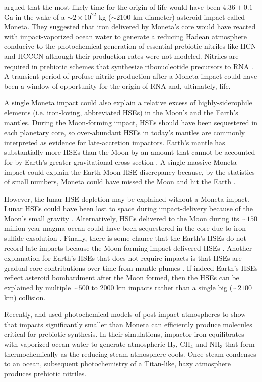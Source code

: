 \documentclass[manuscript]{aastex63}
\begin{document}
\citet{Benner_2020} argued that the most likely time for the origin of life would have been $4.36 \pm 0.1$ Ga in the wake of a $\sim 2 \times 10^{22}$ kg ($\sim 2100$ km diameter) asteroid impact called Moneta. They suggested that iron delivered by Moneta's core would have reacted with impact-vaporized ocean water to generate a reducing Hadean atmosphere conducive to the photochemical generation of essential prebiotic nitriles like HCN and HCCCN although their production rates were not modeled. Nitriles are required in prebiotic schemes that synthesize ribonucleotide precursors to RNA \citep{Patel_2015,Powner_2009,Becker_2019}. A transient period of profuse nitrile production after a Moneta impact could have been a window of opportunity for the origin of RNA and, ultimately, life.

A single Moneta impact could also explain a relative excess of highly-siderophile elements (i.e. iron-loving, abbreviated HSEs) in the Moon's and the Earth's mantles. During the Moon-forming impact, HSEs should have been sequestered in each planetary core, so over-abundant HSEs in today's mantles are commonly interpreted as evidence for late-accretion impactors. Earth's mantle has substantially more HSEs than the Moon by an amount that cannot be accounted for by Earth's greater gravitational cross section \citep{Day_2015}. A single massive Moneta impact could explain the Earth-Moon HSE discrepancy because, by the statistics of small numbers, Moneta could have missed the Moon and hit the Earth \citep{Sleep_1989,Bottke_2010}.

However, the lunar HSE depletion may be explained without a Moneta impact. Lunar HSEs could have been lost to space during impact-delivery because of the Moon's small gravity \citep{Kraus_2015}. Alternatively, HSEs delivered to the Moon during its $\sim 150$ million-year magma ocean could have been sequestered in the core due to iron sulfide exsolution \citep{Morbidelli_2018,Rubie_2016}. Finally, there is some chance that the Earth's HSEs do not record late impacts because the Moon-forming impact delivered HSEs \citep{Sleep_2016}. Another explanation for Earth's HSEs that does not require impacts is that HSEs are gradual core contributions over time from mantle plumes \citep{Halliday_2023,Mundl_2020}. If indeed Earth's HSEs reflect asteroid bombardment after the Moon formed, then the HSEs can be explained by multiple $\sim 500$ to 2000 km impacts rather than a single big ($\sim 2100$ km) collision.

Recently, \citet{Wogan_2023} and \citet{Zahnle_2020} used photochemical models of post-impact atmospheres to show that impacts significantly smaller than Moneta can efficiently produce molecules critical for prebiotic synthesis. In their simulations, impactor iron equilibrates with vaporized ocean water to generate atmospheric H$_2$, CH$_4$ and NH$_3$ that form thermochemically as the reducing steam atmosphere cools. Once steam condenses to an ocean, subsequent photochemistry of a Titan-like, hazy atmosphere produces prebiotic nitriles. 
\end{document}
